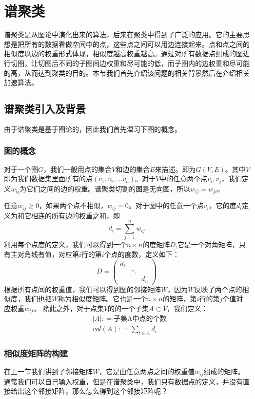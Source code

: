 \chapter{谱聚类}
谱聚类是从图论中演化出来的算法，后来在聚类中得到了广泛的应用。它的主要思想是把所有的数据看做空间中的点，这些点之间可以用边连接起来。点和点之间的相似度以边的权重形式体现，相似度越高权重越高。通过对所有数据点组成的图进行切图，让切图后不同的子图间边权重和尽可能的低，而子图内的边权重和尽可能的高，从而达到聚类的目的。本节我们首先介绍该问题的相关背景然后在介绍相关加速算法。
\section{谱聚类引入及背景}
由于谱聚类是基于图论的，因此我们首先温习下图的概念。

\subsection{图的概念}
对于一个图$G$，我们一般用点的集合$V$和边的集合$E$来描述。即为$G(V,E)$。其中$V$即为我们数据集里面所有的点$(v_1, v_2,...v_n)$。对于$V$中的任意两个点$v_i,v_j$，我们定义$w_{ij}$为它们之间的边的权重。谱聚类切割的图是无向图，所以$w_{ij}=w_{ji}$。
        
任意$w_{ij}\geq 0$，如果两个点不相似，$w_{ij} = 0$。对于图中的任意一个点$v_i$，它的度$d_i$定义为和它相连的所有边的权重之和，即
\begin{equation}
d_i = \sum\limits_{j=1}^{n}w_{ij}
\end{equation}
利用每个点度的定义，我们可以得到一个$n\times n$的度矩阵$D$,它是一个对角矩阵，只有主对角线有值，对应第$i$行的第$i$个点的度数，定义如下：
\begin{equation}
    D =
  \begin{pmatrix}
    d_{1} & & \\
    & \ddots & \\
    & & d_{n}
  \end{pmatrix}
\end{equation}
根据所有点间的权重值，我们可以得到图的邻接矩阵$W$，因为$W$反映了两个点的相似度，我们也把$W$称为相似度矩阵。它也是一个$n\times n$的矩阵，第$i$行的第$j$个值对应权重$w_{ij}$。
除此之外，对于点集$V$的的一个子集$A \subset V$，我们定义：
\begin{align}
& |A|: = \text{子集A中点的个数} \\
& vol(A): = \sum\limits_{i \in A}d_i
\end{align}

\subsection{相似度矩阵的构建}
在上一节我们讲到了邻接矩阵$W$，它是由任意两点之间的权重值$w_{ij}$组成的矩阵。通常我们可以自己输入权重，但是在谱聚类中，我们只有数据点的定义，并没有直接给出这个邻接矩阵，那么怎么得到这个邻接矩阵呢？

